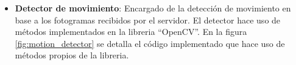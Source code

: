 \begin{itemize}
    \item \textbf{Detector de movimiento}:
    Encargado de la detección de movimiento en base a los fotogramas recibidos por el servidor. El detector hace uso de métodos implementados en la libreria ``OpenCV''. En la figura \ref{fig:motion_detector} se detalla el código implementado que hace uso de métodos propios de la libreria.\\
    

\end{itemize}

